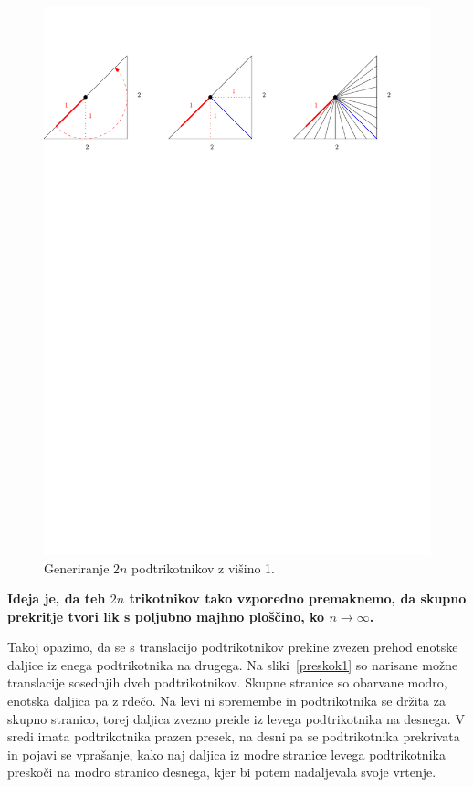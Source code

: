 \documentclass[a4paper, 12pt]{article}
\begin{document}
\begin{figure}[h!]
    \centering
    \includegraphics[width=\textwidth]{ipe_slike/trikotnik_razdelitev.pdf}
    \caption{Generiranje $ 2n $ podtrikotnikov z višino 1.}
    \label{trikotnik_razdelitev}
\end{figure}

\textbf{Ideja je, da teh $ 2n $ trikotnikov tako vzporedno premaknemo, da skupno prekritje tvori lik s poljubno majhno ploščino, ko $ n \to \infty $.}

Takoj opazimo, da se s translacijo podtrikotnikov prekine zvezen prehod enotske daljice iz enega podtrikotnika na drugega. Na sliki~\ref{preskok1} so narisane možne translacije sosednjih dveh podtrikotnikov. Skupne stranice so obarvane modro, enotska daljica pa z rdečo. Na levi ni spremembe in podtrikotnika se držita za skupno stranico, torej daljica zvezno preide iz levega podtrikotnika na desnega. V sredi imata podtrikotnika prazen presek, na desni pa se podtrikotnika prekrivata in pojavi se vprašanje, kako naj daljica iz modre stranice levega podtrikotnika preskoči na modro stranico desnega, kjer bi potem nadaljevala svoje vrtenje.
\end{document}
